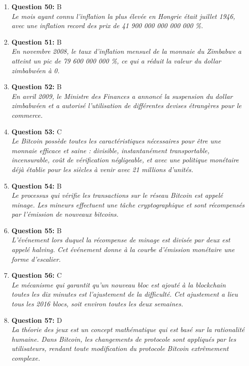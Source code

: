 \documentclass[12pt,a4paper]{article}
\begin{document}
\begin{enumerate}
\item \textbf{Question 50:} B
\\ \textit{Le mois ayant connu l'inflation la plus élevée en Hongrie était juillet 1946, avec une inflation record des prix de 41 900 000 000 000 000 \%.}

\item \textbf{Question 51:} B
\\ \textit{En novembre 2008, le taux d'inflation mensuel de la monnaie du Zimbabwe a atteint un pic de 79 600 000 000 \%, ce qui a réduit la valeur du dollar zimbabwéen à 0.}

\item \textbf{Question 52:} B
\\ \textit{En avril 2009, le Ministre des Finances a annoncé la suspension du dollar zimbabwéen et a autorisé l'utilisation de différentes devises étrangères pour le commerce.}

\item \textbf{Question 53:} C
\\ \textit{Le Bitcoin possède toutes les caractéristiques nécessaires pour être une monnaie efficace et saine : divisible, instantanément transportable, incensurable, coût de vérification négligeable, et avec une politique monétaire déjà établie pour les siècles à venir avec 21 millions d'unités.}

\item \textbf{Question 54:} B
\\ \textit{Le processus qui vérifie les transactions sur le réseau Bitcoin est appelé minage. Les mineurs effectuent une tâche cryptographique et sont récompensés par l'émission de nouveaux bitcoins.}

\item \textbf{Question 55:} B
\\ \textit{L'événement lors duquel la récompense de minage est divisée par deux est appelé halving. Cet événement donne à la courbe d'émission monétaire une forme d'escalier.}

\item \textbf{Question 56:} C
\\ \textit{Le mécanisme qui garantit qu'un nouveau bloc est ajouté à la blockchain toutes les dix minutes est l'ajustement de la difficulté. Cet ajustement a lieu tous les 2016 blocs, soit environ toutes les deux semaines.}

\item \textbf{Question 57:} D
\\ \textit{La théorie des jeux est un concept mathématique qui est basé sur la rationalité humaine. Dans Bitcoin, les changements de protocole sont appliqués par les utilisateurs, rendant toute modification du protocole Bitcoin extrêmement complexe.}


\end{enumerate}
\end{document}
